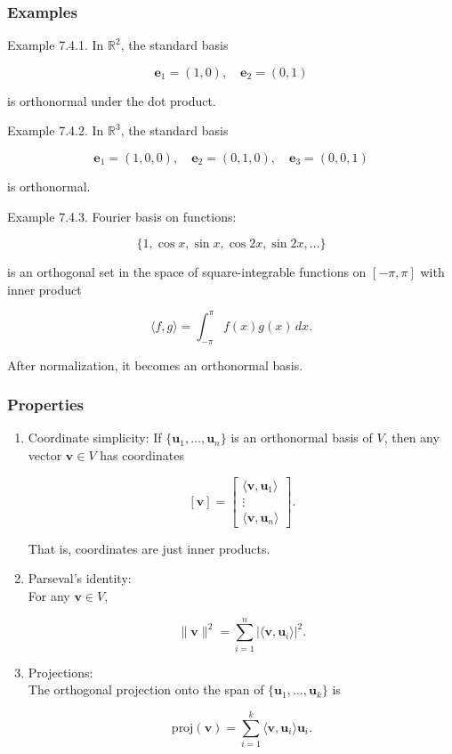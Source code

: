 \documentclass[
  12pt,
  a4paper,
]{article}
\begin{document}
\subsubsection{Examples}\label{examples-7}

Example 7.4.1. In \(\mathbb{R}^2\), the standard basis

\[\mathbf{e}_1 = (1,0), \quad \mathbf{e}_2 = (0,1)\]

is orthonormal under the dot product.

Example 7.4.2. In \(\mathbb{R}^3\), the standard basis

\[\mathbf{e}_1 = (1,0,0), \quad \mathbf{e}_2 = (0,1,0), \quad \mathbf{e}_3 = (0,0,1)\]

is orthonormal.

Example 7.4.3. Fourier basis on functions:

\[\{1, \cos x, \sin x, \cos 2x, \sin 2x, \dots\}\]

is an orthogonal set in the space of square-integrable functions on
\([-\pi,\pi]\) with inner product

\[\langle f,g \rangle = \int_{-\pi}^{\pi} f(x) g(x)\, dx.\]

After normalization, it becomes an orthonormal basis.

\subsubsection{Properties}\label{properties}

\begin{enumerate}
\def\labelenumi{\arabic{enumi}.}
\item
  Coordinate simplicity: If \(\{\mathbf{u}_1,\dots,\mathbf{u}_n\}\) is
  an orthonormal basis of \(V\), then any vector \(\mathbf{v}\in V\) has
  coordinates

  \[[\mathbf{v}] = \begin{bmatrix} \langle \mathbf{v}, \mathbf{u}_1 \rangle \\ \vdots \\ \langle \mathbf{v}, \mathbf{u}_n \rangle \end{bmatrix}.\]

  That is, coordinates are just inner products.
\item
  Parseval's identity:\\
  For any \(\mathbf{v} \in V\),

  \[\|\mathbf{v}\|^2 = \sum_{i=1}^n |\langle \mathbf{v}, \mathbf{u}_i \rangle|^2.\]
\item
  Projections:\\
  The orthogonal projection onto the span of
  \(\{\mathbf{u}_1,\dots,\mathbf{u}_k\}\) is

  \[\text{proj}(\mathbf{v}) = \sum_{i=1}^k \langle \mathbf{v}, \mathbf{u}_i \rangle \mathbf{u}_i.\]
\end{enumerate}
\end{document}
